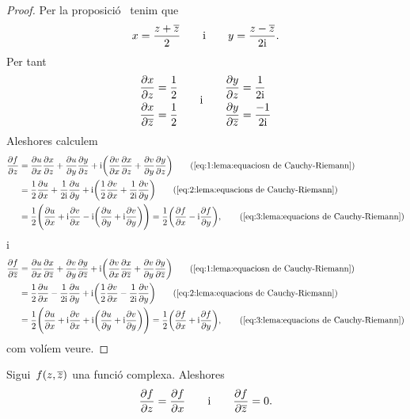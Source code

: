 \documentclass[../Apunts.tex]{subfiles}
\begin{document}
	\begin{proof}
		Per la proposició~ tenim que
		\[x=\frac{z+\overline{z}}{2}\qquad\text{i}\qquad y=\frac{z-\overline{z}}{2\mathrm{i}}.\]
		Per tant
		\begin{gather}
			\label{eq:2:lema:equacions de Cauchy-Riemann}
			\begin{split}
				\frac{\partial x}{\partial z}&=\frac{1}{2}\\
				\frac{\partial x}{\partial\overline{z}}&=\frac{1}{2}
			\end{split}\qquad\text{i}\qquad
			\begin{split}
				\frac{\partial y}{\partial z}&=\frac{1}{2\mathrm{i}}\\
				\frac{\partial y}{\partial\overline{z}}&=\frac{-1}{2\mathrm{i}}
			\end{split}
		\end{gather}
		Aleshores calculem
		\begin{align*}
			\frac{\partial f}{\partial z}&=\frac{\partial u}{\partial x}\frac{\partial x}{\partial z}+\frac{\partial u}{\partial y}\frac{\partial y}{\partial z}+\iu\biggl(\frac{\partial v}{\partial x}\frac{\partial x}{\partial z}+\frac{\partial v}{\partial y}\frac{\partial y}{\partial z}\biggr) \tag{\ref{eq:1:lema:equaciosn de Cauchy-Riemann}}\\
			&=\frac{1}{2}\frac{\partial u}{\partial x}+\frac{1}{2\iu}\frac{\partial u}{\partial y}+\iu\biggl(\frac{1}{2}\frac{\partial v}{\partial x}+\frac{1}{2\iu}\frac{\partial v}{\partial y}\biggr) \tag{\ref{eq:2:lema:equacions de Cauchy-Riemann}}\\
			&=\frac{1}{2}\Biggl(\frac{\partial u}{\partial x}+\iu\frac{\partial v}{\partial x}-\iu\biggl(\frac{\partial u}{\partial y}+\iu\frac{\partial v}{\partial y}\biggr)\Biggr)=\frac{1}{2}\biggl(\frac{\partial f}{\partial x}-\iu\frac{\partial f}{\partial y	}\biggr), \tag{\ref{eq:3:lema:equacions de Cauchy-Riemann}}
		\end{align*}
		i
		\begin{align*}
			\frac{\partial f}{\partial\conjugat{z}}&=\frac{\partial u}{\partial x}\frac{\partial x}{\partial\conjugat{z}}+\frac{\partial v}{\partial y}\frac{\partial y}{\partial\conjugat{z}}+\iu\biggl(\frac{\partial v}{\partial x}\frac{\partial x}{\partial\conjugat{z}}+\frac{\partial v}{\partial y}\frac{\partial y}{\partial\conjugat{z}}\biggr)  \tag{\ref{eq:1:lema:equaciosn de Cauchy-Riemann}}\\
			&=\frac{1}{2}\frac{\partial u}{\partial x}-\frac{1}{2\iu}\frac{\partial u}{\partial y}+\iu\biggl(\frac{1}{2}\frac{\partial v}{\partial x}-\frac{1}{2\iu}\frac{\partial v}{\partial y}\biggr) \tag{\ref{eq:2:lema:equacions de Cauchy-Riemann}}\\
			&=\frac{1}{2}\Biggl(\frac{\partial u}{\partial x}+\iu\frac{\partial v}{\partial x}+\iu\biggl(\frac{\partial u}{\partial y}+\iu\frac{\partial v}{\partial y}\biggr)\Biggr)=\frac{1}{2}\biggl(\frac{\partial f}{\partial x}+\iu\frac{\partial f}{\partial y}\biggr), \tag{\ref{eq:3:lema:equacions de Cauchy-Riemann}}
		\end{align*}
		com volíem veure.
	\end{proof}
	\begin{observation}
		Sigui~\(f(z,\overline{z})\) una funció complexa. Aleshores
		\[\frac{\partial f}{\partial z}=\frac{\partial f}{\partial x}\qquad\text{i}\qquad\frac{\partial f}{\partial\overline{z}}=0.\]
	\end{observation}
\end{document}
